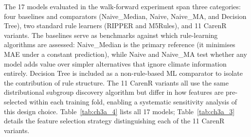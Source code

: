 The 17 models evaluated in the walk-forward experiment span three categories: four baselines and comparators (Naive\_Median, Naive, Naive\_MA, and Decision Tree), two standard rule learners (RIPPER and M5Rules), and 11 CarenR variants. The baselines serve as benchmarks against which rule-learning algorithms are assessed: Naive\_Median is the primary reference (it minimises MAE under a constant prediction), while Naive and Naive\_MA test whether any model adds value over simpler alternatives that ignore climate information entirely. Decision Tree is included as a non-rule-based ML comparator to isolate the contribution of rule structure. The 11 CarenR variants all use the same distributional subgroup discovery algorithm but differ in how features are pre-selected within each training fold, enabling a systematic sensitivity analysis of this design choice. Table~\ref{tab:ch3a_4} lists all 17 models; Table~\ref{tab:ch3a_3} details the feature selection strategy distinguishing each of the 11 CarenR variants.

